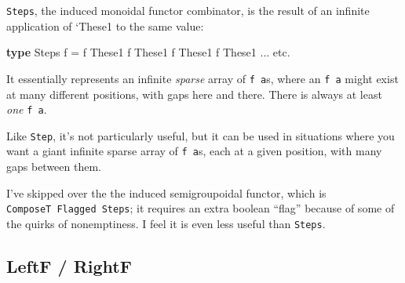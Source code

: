 \documentclass[]{article}
\newenvironment{Shaded}{}{}
\newcommand{\DataTypeTok}[1]{\textcolor[rgb]{0.56,0.13,0.00}{#1}}
\newcommand{\KeywordTok}[1]{\textcolor[rgb]{0.00,0.44,0.13}{\textbf{#1}}}
\newcommand{\NormalTok}[1]{#1}
\newcommand{\OperatorTok}[1]{\textcolor[rgb]{0.40,0.40,0.40}{#1}}
\newcommand{\OtherTok}[1]{\textcolor[rgb]{0.00,0.44,0.13}{#1}}
\begin{document}
\begin{itemize}
  \texttt{Steps}, the induced monoidal functor combinator, is the result of an
  infinite application of `These1 to the same value:

\begin{Shaded}
\begin{Highlighting}[]
\KeywordTok{type} \DataTypeTok{Steps}\NormalTok{ f }\OtherTok{=}\NormalTok{ f }\OtherTok{\textasciigrave{}These1\textasciigrave{}}\NormalTok{ f }\OtherTok{\textasciigrave{}These1\textasciigrave{}}\NormalTok{ f }\OtherTok{\textasciigrave{}These1\textasciigrave{}}\NormalTok{ f }\OtherTok{\textasciigrave{}These1\textasciigrave{}} \OperatorTok{...}\NormalTok{ etc}\OperatorTok{.}
\end{Highlighting}
\end{Shaded}

  It essentially represents an infinite \emph{sparse} array of \texttt{f\ a}s,
  where an \texttt{f\ a} might exist at many different positions, with gaps here
  and there. There is always at least \emph{one} \texttt{f\ a}.

  Like \texttt{Step}, it's not particularly useful, but it can be used in
  situations where you want a giant infinite sparse array of \texttt{f\ a}s,
  each at a given position, with many gaps between them.

  I've skipped over the the induced semigroupoidal functor, which is
  \texttt{ComposeT\ Flagged\ Steps}; it requires an extra boolean ``flag''
  because of some of the quirks of nonemptiness. I feel it is even less useful
  than \texttt{Steps}.
\end{itemize}

\hypertarget{leftf-rightf}{%
\subsection{LeftF / RightF}\label{leftf-rightf}}
\end{document}

